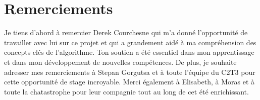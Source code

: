 \section*{Remerciements}
Je tiens d'abord à remercier Derek Courchesne qui m'a donné l'opportunité de travailler avec lui sur ce projet et qui a grandement aidé à ma compréhension des concepts clés de l'algorithme. Ton soutien a été essentiel dans mon apprentissage et dans mon développement de nouvelles compétences. De plus, je souhaite adresser mes remerciements à Stepan Gorgutsa et à toute l'équipe du C2T3 pour cette opportunité de stage incroyable. Merci également à Elisabeth, à Moras et à toute la chatastrophe pour leur compagnie tout au long de cet été enrichissant.
